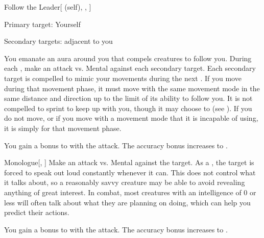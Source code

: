 \lowercase{\hypertarget{spell:Follow the Leader}{}}\label{spell:Follow the Leader}
\begin{attuneability}[Rank 3]{\hypertarget{spell:Follow the Leader}{Follow the Leader}}[ (self), , ]

Primary target: Yourself
\par\noindent
Secondary targets:  adjacent to you

You emanate an aura around you that compels creatures to follow you.
During each , make an attack vs. Mental against each secondary target.
\hit Each secondary target is compelled to mimic your movements during the next .
If you move during that movement phase, it must move with the same movement mode in the same distance and direction up to the limit of its ability to follow you.
It is not compelled to sprint to keep up with you, though it may choose to (see ).
If you do not move, or if you move with a movement mode that it is incapable of using, it is simply  for that movement phase.

\rankline
{} You gain a  bonus to  with the attack.
 The accuracy bonus increases to .

\end{attuneability}
\vspace{0.25em}



\lowercase{\hypertarget{spell:Monologue}{}}\label{spell:Monologue}
\begin{freeability}[Rank 3]{\hypertarget{spell:Monologue}{Monologue}}[, ]
Make an attack vs. Mental against the target.
\hit As a , the target is forced to speak out loud constantly whenever it can.
This does not control what it talks about, so a reasonably savvy creature may be able to avoid revealing anything of great interest.
In combat, most creatures with an intelligence of 0 or less will often talk about what they are planning on doing, which can help you predict their actions.

\rankline
{} You gain a  bonus to  with the attack.
 The accuracy bonus increases to .

\end{freeability}
\vspace{0.25em}



